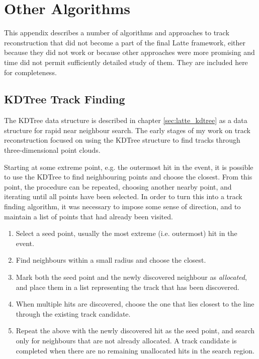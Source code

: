 \chapter{Other Algorithms}
This appendix describes a number of algorithms and approaches to track reconstruction that did not become a part of the final Latte framework, either because they did not work or because other approaches were more promising and time did not permit sufficiently detailed study of them. They are included here for completeness.

\section{KDTree Track Finding}
The KDTree data structure is described in chapter \ref{sec:latte_kdtree} as a data structure for rapid near neighbour search. The early stages of my work on track reconstruction focused on using the KDTree structure to find tracks through three-dimensional point clouds.

Starting at some extreme point, e.g. the outermost hit in the event, it is possible to use the KDTree to find neighbouring points and choose the closest. From this point, the procedure can be repeated, choosing another nearby point, and iterating until all points have been selected. In order to turn this into a track finding algorithm, it was necessary to impose some sense of direction, and to maintain a list of points that had already been visited.

\begin{enumerate}
    \item Select a seed point, usually the most extreme (i.e. outermost) hit in the event.
    \item Find neighbours within a small radius and choose the closest.
    \item Mark both the seed point and the newly discovered neighbour as \emph{allocated}, and place them in a list representing the track that has been discovered.
    \item When multiple hits are discovered, choose the one that lies closest to the line through the existing track candidate.
    \item Repeat the above with the newly discovered hit as the seed point, and search only for neighbours that are not already allocated. A track candidate is completed when there are no remaining unallocated hits in the search region.
\end{enumerate}

